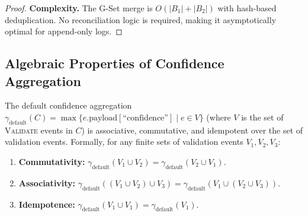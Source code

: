\begin{proof}
\textbf{Complexity.} The G-Set merge is $O(|B_1| + |B_2|)$ with hash-based deduplication. No reconciliation logic is required, making it asymptotically optimal for append-only logs.
\end{proof}

\subsection{Algebraic Properties of Confidence Aggregation}

\begin{theorem}\label{thm:gamma-default-algebraic}
The default confidence aggregation $\gamma_{\text{default}}(C) = \max\{e.\text{payload}[\text{``confidence''}] \mid e \in V\}$ (where $V$ is the set of \textsc{Validate} events in $C$) is associative, commutative, and idempotent over the set of validation events. Formally, for any finite sets of validation events $V_1, V_2, V_3$:
\begin{enumerate}[label=(\roman*)]
    \item \textbf{Commutativity:} $\gamma_{\text{default}}(V_1 \cup V_2) = \gamma_{\text{default}}(V_2 \cup V_1)$.
    \item \textbf{Associativity:} $\gamma_{\text{default}}((V_1 \cup V_2) \cup V_3) = \gamma_{\text{default}}(V_1 \cup (V_2 \cup V_3))$.
    \item \textbf{Idempotence:} $\gamma_{\text{default}}(V_1 \cup V_1) = \gamma_{\text{default}}(V_1)$.
\end{enumerate}
\end{theorem}

